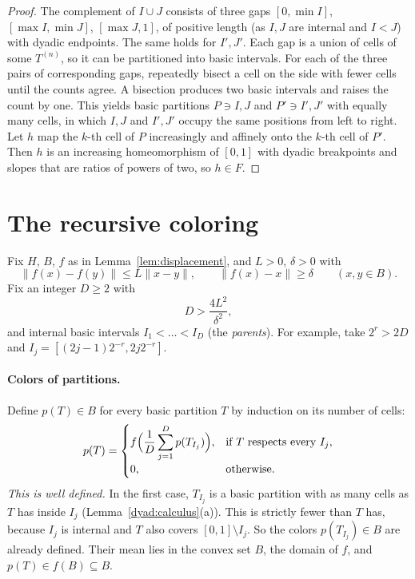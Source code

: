 \documentclass[11pt]{article}
\newcommand{\norm}[1]{\lVert #1\rVert}
\theoremstyle{definition}
\numberwithin{equation}{section}
\begin{document}
\begin{proof}
The complement of $I\cup J$ consists of three gaps $[0,\min I]$,
$[\max I,\min J]$, $[\max J,1]$, of positive length (as $I,J$ are internal
and $I<J$) with dyadic endpoints. The same holds for $I',J'$. Each gap is a
union of cells of some $T^{(n)}$, so it can be partitioned into basic
intervals. For each of the three pairs of corresponding gaps, repeatedly
bisect a cell on the side with fewer cells until the counts agree. A
bisection produces two basic intervals and raises the count by one. This
yields basic partitions $P\ni I,J$ and $P'\ni I',J'$ with equally many
cells, in which $I,J$ and $I',J'$ occupy the same positions from left to
right. Let $h$ map the $k$-th cell of $P$ increasingly and affinely onto the
$k$-th cell of $P'$. Then $h$ is an increasing homeomorphism of $[0,1]$ with
dyadic breakpoints and slopes that are ratios of powers of two, so $h\in F$.
\end{proof}

\section{The recursive coloring}\label{sec:coloring}

Fix $H$, $B$, $f$ as in Lemma~\ref{lem:displacement}, and $L>0$,
$\delta>0$ with
\begin{equation}\label{color:map}
  \norm{f(x)-f(y)}\le L\norm{x-y},\qquad\norm{f(x)-x}\ge\delta
  \qquad(x,y\in B).
\end{equation}
Fix an integer $D\ge2$ with
\begin{equation}\label{color:parameters}
  D>\frac{4L^2}{\delta^2},
\end{equation}
and internal basic intervals $I_1<\dots<I_D$ (the \emph{parents}). For
example, take $2^r>2D$ and $I_j=[(2j-1)2^{-r},2j2^{-r}]$.

\paragraph{Colors of partitions.}
Define $p(T)\in B$ for every basic partition $T$ by induction on its number
of cells:
\begin{equation}\label{color:recursion}
  p(T)=
  \begin{cases}
  \displaystyle f\Bigl(\frac1D\sum_{j=1}^D p(T_{I_j})\Bigr),
       &\text{if $T$ respects every $I_j$},\\[6pt]
  0,   &\text{otherwise}.
  \end{cases}
\end{equation}
\emph{This is well defined.} In the first case, $T_{I_j}$ is a basic
partition with as many cells as $T$ has inside $I_j$
(Lemma~\ref{dyad:calculus}(a)). This is strictly fewer than $T$ has,
because $I_j$ is internal and $T$ also covers $[0,1]\setminus I_j$. So the
colors $p(T_{I_j})\in B$ are already defined. Their mean lies in the convex
set $B$, the domain of $f$, and $p(T)\in f(B)\subseteq B$.
\end{document}
